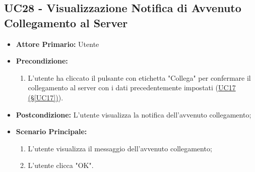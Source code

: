 \subsection{UC28 - Visualizzazione Notifica di Avvenuto Collegamento al Server}\label{UC28}
\begin{itemize}
	\item \textbf{Attore Primario:}  Utente
	\item \textbf{Precondizione:} 
	\begin{enumerate}
		\item L'utente ha cliccato il pulsante con etichetta "Collega" per confermare il collegamento al server con i dati precedentemente impostati (\hyperref[UC17]{UC17 (§\ref*{UC17})}).
	\end{enumerate}	
	\item \textbf{Postcondizione:} L'utente visualizza la notifica dell'avvenuto collegamento;
	\item \textbf{Scenario Principale:}
	\begin{enumerate}
		\item L'utente visualizza il messaggio dell'avvenuto collegamento;
		\item L'utente clicca "OK".
	\end{enumerate}
\end{itemize}

